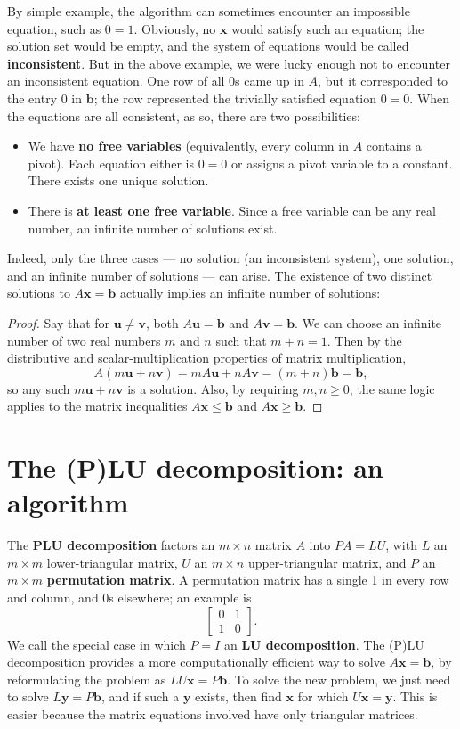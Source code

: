 \documentclass[draft,12pt]{report}
\renewcommand{\vec}[1]{\mathbf{#1}}
\begin{document}
By simple example, the algorithm can sometimes encounter an impossible equation, such as $0 = 1$. Obviously, no $\vec{x}$ would satisfy such an equation; the solution set would be empty, and the system of equations would be called \textbf{inconsistent}. But in the above example, we were lucky enough not to encounter an inconsistent equation. One row of all 0s came up in $A$, but it corresponded to the entry 0 in $\vec{b}$; the row represented the trivially satisfied equation $0 = 0$. When the equations are all consistent, as so, there are two possibilities:
\begin{itemize}
    \item We have \textbf{no free variables} (equivalently, every column in $A$ contains a pivot). Each equation either is $0 = 0$ or assigns a pivot variable to a constant. There exists one unique solution.
    \item There is \textbf{at least one free variable}. Since a free variable can be any real number, an infinite number of solutions exist.
\end{itemize}
Indeed, only the three cases --- no solution (an inconsistent system), one solution, and an infinite number of solutions --- can arise. The existence of two distinct solutions to $A\vec{x} = \vec{b}$ actually implies an infinite number of solutions:
\begin{proof}
    Say that for $\vec{u} \neq \vec{v}$, both $A\vec{u} = \vec{b}$ and $A\vec{v} = \vec{b}$. We can choose an infinite number of two real numbers $m$ and $n$ such that $m + n = 1$. Then by the distributive and scalar-multiplication properties of matrix multiplication,
    \[ A(m\vec{u} + n\vec{v}) = mA\vec{u} + nA\vec{v} = (m + n)\vec{b} = \vec{b}, \]
    so any such $m\vec{u} + n\vec{v}$ is a solution. Also, by requiring $m, n \geq 0$, the same logic applies to the matrix inequalities $A\vec{x} \leq \vec{b}$ and $A\vec{x} \geq \vec{b}$.
\end{proof}

\section{The (P)LU decomposition: an algorithm}

The \textbf{PLU decomposition} factors an $m \times n$ matrix $A$ into $PA = LU$, with $L$ an $m \times m$ lower-triangular matrix, $U$ an $m \times n$ upper-triangular matrix, and $P$ an $m \times m$ \textbf{permutation matrix}. A permutation matrix has a single 1 in every row and column, and 0s elsewhere; an example is
\[ \begin{bmatrix} 
    0 & 1 \\
    1 & 0
\end{bmatrix}. \]
We call the special case in which $P = I$ an \textbf{LU decomposition}. The (P)LU decomposition provides a more computationally efficient way to solve $A\vec{x} = \vec{b}$, by reformulating the problem as $LU\vec{x} = P\vec{b}$. To solve the new problem, we just need to solve $L\vec{y} = P\vec{b}$, and if such a $\vec{y}$ exists, then find $\vec{x}$ for which $U\vec{x} = \vec{y}$. This is easier because the matrix equations involved have only triangular matrices.
\end{document}

